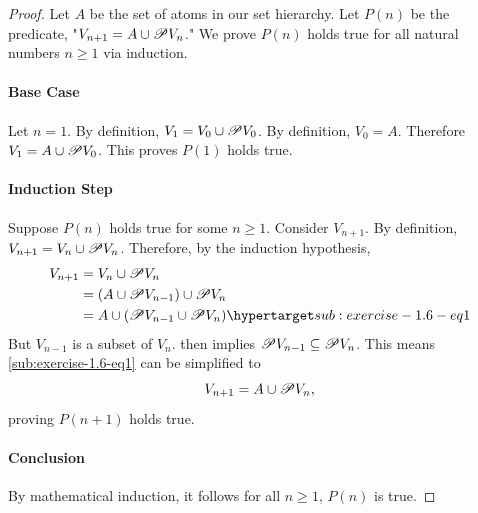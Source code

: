 \documentclass{report}
\begin{document}
\begin{proof}

  Let $A$ be the set of atoms in our set hierarchy.
  Let $P(n)$ be the predicate, "$V_{n + 1} = A \cup \mathscr{P}V_n$."
  We prove $P(n)$ holds true for all natural numbers $n \geq 1$ via induction.

  \paragraph{Base Case}%

    Let $n = 1$.
    By definition, $V_1 = V_0 \cup \mathscr{P}V_0$.
    By definition, $V_0 = A$.
    Therefore $V_1 = A \cup \mathscr{P}V_0$.
    This proves $P(1)$ holds true.

  \paragraph{Induction Step}%

    Suppose $P(n)$ holds true for some $n \geq 1$.
    Consider $V_{n+1}$.
    By definition, $V_{n+1} = V_n \cup \mathscr{P}V_n$.
    Therefore, by the induction hypothesis,
      \begin{align}
        V_{n+1}
          & = V_n \cup \powerset{V_n}
            \nonumber \\
          & = (A \cup \powerset{V_{n-1}}) \cup \powerset{V_n}
            \nonumber \\
          & = A \cup (\powerset{V_{n-1}} \cup \powerset{V_n})
            \hyperlabel{sub:exercise-1.6-eq1}
      \end{align}
    But $V_{n-1}$ is a subset of $V_n$.
     then implies
      $\mathscr{P}V_{n-1} \subseteq \mathscr{P}V_n$.
    This means \eqref{sub:exercise-1.6-eq1} can be simplified to
      $$V_{n+1} = A \cup \mathscr{P}V_n,$$
    proving $P(n+1)$ holds true.

  \paragraph{Conclusion}%

    By mathematical induction, it follows for all $n \geq 1$, $P(n)$ is true.

\end{proof}

\subsection{}%
\end{document}
